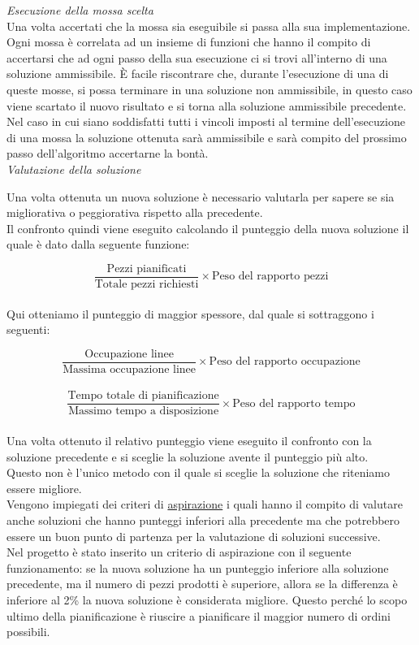 \textit{Esecuzione della mossa scelta}\\
Una volta accertati che la mossa sia eseguibile si passa alla sua implementazione.\\ Ogni mossa è correlata ad un insieme di funzioni che hanno il compito di accertarsi che ad
ogni passo della sua esecuzione ci si trovi all'interno di una soluzione ammissibile. È facile riscontrare che, durante l'esecuzione di una di queste mosse, si possa terminare 
in una soluzione non ammissibile, in questo caso viene scartato il nuovo risultato e si torna alla soluzione ammissibile precedente.\\ Nel caso in cui siano soddisfatti tutti
i vincoli imposti al termine dell'esecuzione di una mossa la soluzione ottenuta sarà ammissibile e sarà compito del prossimo passo dell'algoritmo accertarne la bontà.\\

\textit{Valutazione della soluzione}

Una volta ottenuta un nuova soluzione è necessario valutarla per sapere se sia migliorativa o peggiorativa rispetto alla precedente.\\
Il confronto quindi viene eseguito calcolando il punteggio della nuova soluzione il quale è dato dalla seguente funzione:

\[\frac{\text{Pezzi pianificati}}{\text{Totale pezzi richiesti}} \times \text{Peso del rapporto pezzi}\]\\

Qui otteniamo il punteggio di maggior spessore, dal quale si sottraggono i seguenti:

\[\frac{\text{Occupazione linee}}{\text{Massima occupazione linee}} \times \text{Peso del rapporto occupazione}\]\\

\[\frac{\text{Tempo totale di pianificazione}}{\text{Massimo tempo a disposizione}} \times \text{Peso del rapporto tempo}\]\\

Una volta ottenuto il relativo punteggio viene eseguito il confronto con la soluzione precedente e si sceglie la soluzione avente il punteggio più alto.\\
Questo non è l'unico metodo con il quale si sceglie la soluzione che riteniamo essere migliore.\\ Vengono impiegati dei criteri di \hyperref[Criteri di aspirazione]{aspirazione\glo} i quali hanno il compito
di valutare anche soluzioni che hanno punteggi inferiori alla precedente ma che potrebbero essere un buon punto di partenza per la valutazione di soluzioni successive.\\
Nel progetto è stato inserito un criterio di aspirazione con il seguente funzionamento: se la nuova soluzione ha un punteggio inferiore alla soluzione precedente, ma il 
numero di pezzi prodotti è superiore, allora se la differenza è inferiore al 2\% la nuova soluzione è considerata migliore. Questo perché lo scopo ultimo della pianificazione
è riuscire a pianificare il maggior numero di ordini possibili.


